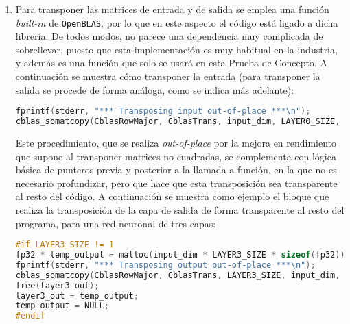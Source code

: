 \begin{enumerate}
    \item Para transponer las matrices de entrada y de salida se emplea una función \textit{built-in} de \texttt{OpenBLAS}, por lo que en este aspecto el código está ligado a dicha librería. De todos modos, no parece una dependencia muy complicada de sobrellevar, puesto que esta implementación es muy habitual en la industria, y además es una función que solo se usará en esta Prueba de Concepto. A continuación se muestra cómo transponer la entrada (para transponer la salida se procede de forma análoga, como se indica más adelante):\medskip
\begin{lstlisting}[language=C]
fprintf(stderr, "*** Transposing input out-of-place ***\n");
cblas_somatcopy(CblasRowMajor, CblasTrans, input_dim, LAYER0_SIZE, 1.f, (float *) input, LAYER0_SIZE, (float *) temp_input, input_dim);
\end{lstlisting}

    Este procedimiento, que se realiza \textit{out-of-place} por la mejora en rendimiento que supone al transponer matrices no cuadradas, se complementa con lógica básica de punteros previa y posterior a la llamada a función, en la que no es necesario profundizar, pero que hace que esta transposición sea transparente al resto del código. A continuación se muestra como ejemplo el bloque que realiza la transposición de la capa de salida de forma transparente al resto del programa, para una red neuronal de tres capas:\medskip
\begin{lstlisting}[language=C]
#if LAYER3_SIZE != 1
fp32 * temp_output = malloc(input_dim * LAYER3_SIZE * sizeof(fp32));
fprintf(stderr, "*** Transposing output out-of-place ***\n");
cblas_somatcopy(CblasRowMajor, CblasTrans, LAYER3_SIZE, input_dim, 1.f, (float *) layer3_out, input_dim, (float *) temp_output, LAYER3_SIZE);
free(layer3_out);
layer3_out = temp_output;
temp_output = NULL;
#endif
\end{lstlisting}


\end{enumerate}
